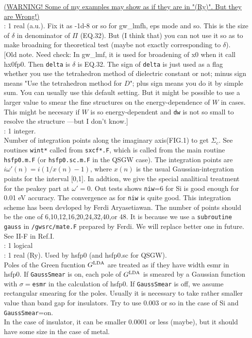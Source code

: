 \documentclass[a4paper,10pt,epsf,fleqn]{article}
\newcommand{\keyw}[1]{\fbox{\tt #1}}
\begin{document}
{\begin{enumerate}
\underline{(WARNING! Some of my examples may show as if they are in "(Ry)". But they are Wrong!)}\\

\vspace{2mm}
\keyw{delta} : 1 real (a.u.). Fix it as -1d-8 or so for gw\_lmfh, eps mode and so.
This is the size of $\delta$ in denominator of $\Pi$ (EQ.32).
But (I think that) you can not use it so as to make broadning 
for theoretical test (maybe not exactly corresponding to $\delta$).\\

[Old note. Need check:
In gw\_lmf, it is used for broadening of x0 when it call hx0fp0.
Then {\tt delta} is $\delta$ is EQ.32.
The sign of {\tt delta} is just used as a flag whether you use the
tetrahedron method of dielectric constant \cite{rath75} or not; minus sign means
"Use the tetrahedron method for $D$"; plus sign means you do it by simple sum.
You can usually use this default setting. But it might be possible
to use a larger value to smear the fine structures
on the energy-dependence of $W$ in cases.
This might be necesary if $W$ is so energy-dependent 
and \verb#dw# is not so small to resolve the structure
---but I don't know.]\\


\keyw{niw} : 1 integer. \\
Number of integration points along the imaginary axis(FIG.1)
to get $\Sigma_c$.
See routines {\tt wint*} called from {\tt sxcf*.F},
which is called from the main routine {\tt hsfp0.m.F} (or {\tt hsfp0.sc.m.F} in the QSGW case).
The integration points are
$i \omega'(n)= i( 1/x(n) -1)$, where $x(n)$ is
the usual Gaussian-integration points for the interval [0,1].
In addtion, we give the special analitical treatment for
the peakey part at $\omega'=0$.
Out tests shows {\tt niw}=6 for Si is good enough for 0.01 eV accuracy.
The convergence as for {\tt niw} is quite good.
This integration scheme has been devloped by Ferdi Aryasetiawan.
The number of points should be the one of 6,10,12,16,20,24,32,40,or 48. 
It is because we use a {\tt subroutine gauss} in {\tt /gwsrc/mate.F} 
prepared by Ferdi. We will replace better one in future.
See II-F in Ref.I.\\

\keyw{GaussSmear} : 1 logical \\
\keyw{esmr} : 1 real (Ry). Used by hsfp0 (and hsfp0.sc for QSGW). \\
Poles of  the Green fucntion $G^{\rm LDA}$ are treated as if they have width esmr in hsfp0. 
If {\tt GaussSmear} is on, each pole of $G^{\rm LDA}$
is smeared by a Gaussian function with $\sigma=${\tt esmr} in the calculation of hsfp0.
If {\tt GaussSmear} is off, we assume rectangular smearing for the poles.
Usually it is necessary to take rather smaller value than band gap 
for insulators. Try to use 0.003 or so in the case of Si and {\tt GaussSmear}=on.\\
In the case of insulator, it can be smaller 0.0001 or less (maybe), 
but it should have some size in the case of metal.


\end{enumerate}}
\end{document}

